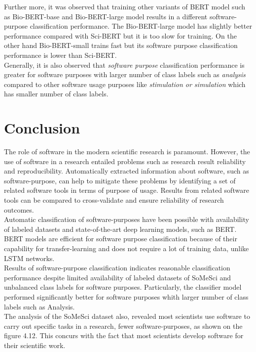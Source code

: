 Further more, it was observed that training other variants of BERT model such as Bio-BERT-base and Bio-BERT-large model results in a different software-purpose classification performance. The Bio-BERT-large model has slightly better performance compared with Sci-BERT but it is too slow for training. On the other hand Bio-BERT-small trains fast but its software purpose classification performance is lower than Sci-BERT. \\


Generally, it is also observed that \emph{software purpose} classification performance is greater for software purposes with larger number of class labels such as \emph{analysis} compared to other software usage purposes like \emph{stimulation or simulation} which has smaller number of class labels.   

 

\section{Conclusion}
\label{sec:chapter07:Conclusion}

The role of software in the modern scientific research is paramount. However, the use of software in a research entailed problems such as research result reliability and reproducibility. Automatically extracted information about software, such as software-purpose, can help to mitigate these problems by identifying a set of related software tools in terms of purpose of usage. Results from related software tools can be compared to cross-validate and ensure reliability of research outcomes. \\


Automatic classification of software-purposes have been possible with availability of labeled datasets and state-of-the-art deep learning models, such as \ac{BERT}. BERT models are efficient for software purpose classification because of their capability for transfer-learning and does not require a lot of training data, unlike \ac{LSTM} networks. \\

Results of software-purpose classification indicates reasonable classification performance despite limited availability of labeled datasets of \ac{SoMeSci} and unbalanced class labels for software purposes. Particularly, the classifier model performed significantly better for software purposes whith larger number of class labels such as Analysis. \\


The analysis of the \ac{SoMeSci} dataset also, revealed most scientists use software to carry out specific tasks in a research, fewer software-purposes, as shown on the figure 4.12. This concurs with the fact that most scientists develop software for their scientific work. \\ 


